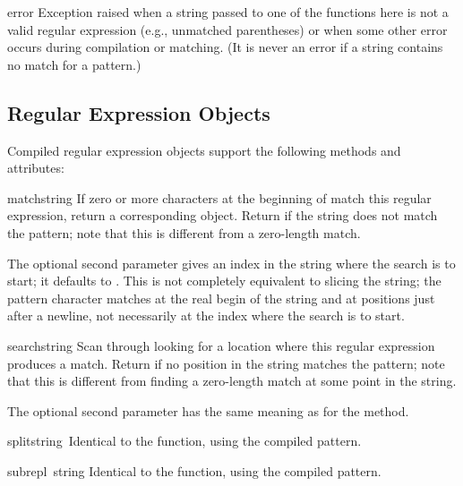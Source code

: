 \begin{excdesc}{error}
  Exception raised when a string passed to one of the functions here
  is not a valid regular expression (e.g., unmatched parentheses) or
  when some other error occurs during compilation or matching.  (It is
  never an error if a string contains no match for a pattern.)
\end{excdesc}

\subsection{Regular Expression Objects}
Compiled regular expression objects support the following methods and
attributes:

\renewcommand{\indexsubitem}{(re method)}
\begin{funcdesc}{match}{string}
  If zero or more characters at the beginning of  match
  this regular expression, return a corresponding
   object.  Return  if the string does not
  match the pattern; note that this is different from a zero-length
  match.
  
  The optional second parameter  gives an index in the string
  where the search is to start; it defaults to .  This is not
  completely equivalent to slicing the string; the  pattern
  character matches at the real begin of the string and at positions
  just after a newline, not necessarily at the index where the search
  is to start.
\end{funcdesc}

\begin{funcdesc}{search}{string}
  Scan through  looking for a location where this regular
  expression produces a match.  Return  if no
  position in the string matches the pattern; note that this is
  different from finding a zero-length match at some point in the string.
  
  The optional second parameter has the same meaning as for the
   method.
\end{funcdesc}

\begin{funcdesc}{split}{string\, }
Identical to the  function, using the compiled pattern.
\end{funcdesc}

\begin{funcdesc}{sub}{repl\, string}
Identical to the  function, using the compiled pattern.
\end{funcdesc}

